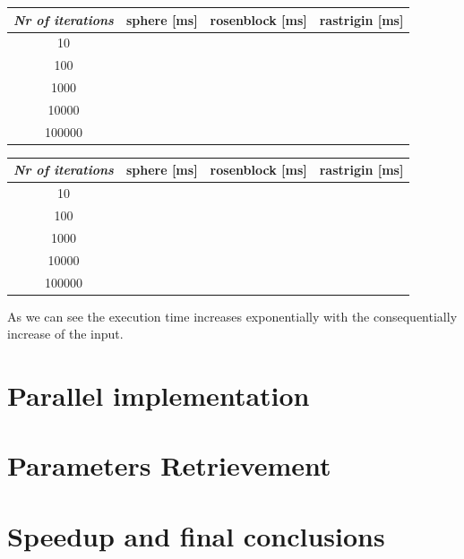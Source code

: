 \documentclass[10pt]{article}
\begin{document}
\begin{multicols}{2}
\begin{table}[H]
\begin{tabular}{| c | c | c | c |}
  \hline
  \textit{Nr of iterations} & \textbf{sphere [ms]} & \textbf{rosenblock [ms]} & \textbf{rastrigin [ms]}\\
  \hline
  10 \\
  \hline

  100 \\
  \hline

  1000 \\
  \hline

  10000 \\ 
  \hline

  100000 \\
  \hline
\end{tabular}

\end{table}

\begin{table}[H]
  \begin{tabular}{| c | c | c | c |}
    \hline
    \textit{Nr of iterations} & \textbf{sphere [ms]} & \textbf{rosenblock [ms]} & \textbf{rastrigin [ms]}\\
    \hline
    10 \\
    \hline
  
    100 \\
    \hline
  
    1000 \\
    \hline
  
    10000 \\ 
    \hline
  
    100000 \\
    \hline
  \end{tabular}
\end{table}

\noindent As we can see the execution time increases exponentially with the consequentially increase of
the input.

\section{Parallel implementation}

\section{Parameters Retrievement}

\section{Speedup and final conclusions}

\end{multicols}



\end{document}

